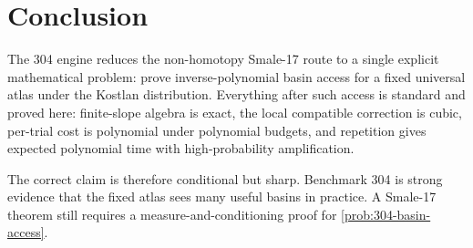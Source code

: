 \documentclass[11pt]{article}
\begin{document}
\section{Conclusion}

The 304 engine reduces the non-homotopy Smale-17 route to a single explicit mathematical problem: prove inverse-polynomial basin access for a fixed universal atlas under the Kostlan distribution.  Everything after such access is standard and proved here: finite-slope algebra is exact, the local compatible correction is cubic, per-trial cost is polynomial under polynomial budgets, and repetition gives expected polynomial time with high-probability amplification.

The correct claim is therefore conditional but sharp.  Benchmark 304 is strong evidence that the fixed atlas sees many useful basins in practice.  A Smale-17 theorem still requires a measure-and-conditioning proof for \cref{prob:304-basin-access}.
\end{document}
